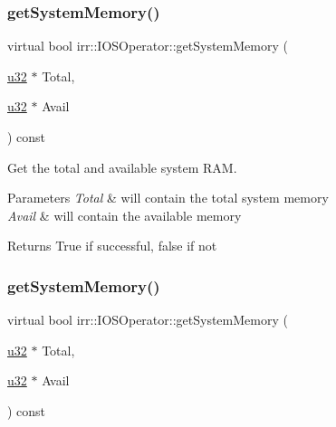 \subsubsection{\texorpdfstring{get\+System\+Memory()}{getSystemMemory()}\hspace{0.1cm}{\footnotesize\ttfamily [1/2]}}
{\footnotesize\ttfamily virtual bool irr\+::\+I\+O\+S\+Operator\+::get\+System\+Memory (\begin{DoxyParamCaption}\item[{\hyperlink{namespaceirr_a0416a53257075833e7002efd0a18e804}{u32} $\ast$}]{Total,  }\item[{\hyperlink{namespaceirr_a0416a53257075833e7002efd0a18e804}{u32} $\ast$}]{Avail }\end{DoxyParamCaption}) const\hspace{0.3cm}{\ttfamily [pure virtual]}}



Get the total and available system R\+AM. 


\begin{DoxyParams}{Parameters}
{\em Total} & will contain the total system memory \\
\hline
{\em Avail} & will contain the available memory \\
\hline
\end{DoxyParams}
\begin{DoxyReturn}{Returns}
True if successful, false if not 
\end{DoxyReturn}
\mbox{\label{classirr_1_1IOSOperator_af58b50cecf28f247e1f302ee0b9e8270}} 
\subsubsection{\texorpdfstring{get\+System\+Memory()}{getSystemMemory()}\hspace{0.1cm}{\footnotesize\ttfamily [2/2]}}
{\footnotesize\ttfamily virtual bool irr\+::\+I\+O\+S\+Operator\+::get\+System\+Memory (\begin{DoxyParamCaption}\item[{\hyperlink{namespaceirr_a0416a53257075833e7002efd0a18e804}{u32} $\ast$}]{Total,  }\item[{\hyperlink{namespaceirr_a0416a53257075833e7002efd0a18e804}{u32} $\ast$}]{Avail }\end{DoxyParamCaption}) const\hspace{0.3cm}{\ttfamily [pure virtual]}}



